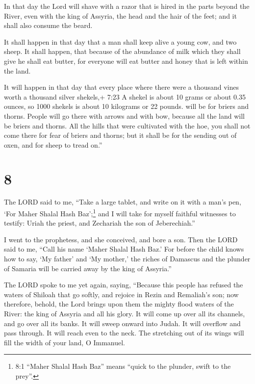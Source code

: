  In that day the Lord will shave with a razor that is hired
in the parts beyond the River, even with the king of Assyria, the head
and the hair of the feet; and it shall also consume the beard.

 It shall happen in that day that a man shall keep alive a
young cow, and two sheep.  It shall happen, that because of
the abundance of milk which they shall give he shall eat butter, for
everyone will eat butter and honey that is left within the land.

 It will happen in that day that every place where there
were a thousand vines worth a thousand silver shekels,+ 7:23 A shekel is
about 10 grams or about 0.35 ounces, so 1000 shekels is about 10
kilograms or 22 pounds. will be for briers and thorns. 
People will go there with arrows and with bow, because all the land will
be briers and thorns.  All the hills that were cultivated
with the hoe, you shall not come there for fear of briers and thorns;
but it shall be for the sending out of oxen, and for sheep to tread
on.''

\hypertarget{section-7}{%
\section{8}\label{section-7}}

 The LORD said to me, ``Take a large tablet, and write on it
with a man's pen, `For Maher Shalal Hash Baz';\footnote{8:1 ``Maher
  Shalal Hash Baz'' means ``quick to the plunder, swift to the prey''.}
 and I will take for myself faithful witnesses to testify:
Uriah the priest, and Zechariah the son of Jeberechiah.''

 I went to the prophetess, and she conceived, and bore a
son. Then the LORD said to me, ``Call his name `Maher Shalal Hash Baz.'
 For before the child knows how to say, `My father' and `My
mother,' the riches of Damascus and the plunder of Samaria will be
carried away by the king of Assyria.''

 The LORD spoke to me yet again, saying, 
``Because this people has refused the waters of Shiloah that go softly,
and rejoice in Rezin and Remaliah's son;  now therefore,
behold, the Lord brings upon them the mighty flood waters of the River:
the king of Assyria and all his glory. It will come up over all its
channels, and go over all its banks.  It will sweep onward
into Judah. It will overflow and pass through. It will reach even to the
neck. The stretching out of its wings will fill the width of your land,
O Immanuel.

